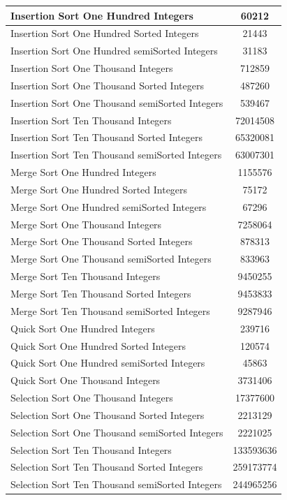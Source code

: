 \documentclass[]{article}
\begin{document}
	\begin{tabular}{|l|c|}
		\hline
		Insertion Sort One Hundred Integers & 60212\\
		\hline
		Insertion Sort One Hundred Sorted Integers & 21443\\
		\hline
		Insertion Sort One Hundred semiSorted Integers & 31183\\
		\hline
		Insertion Sort One Thousand Integers & 712859\\
		\hline
		Insertion Sort One Thousand Sorted Integers & 487260\\
		\hline
		Insertion Sort One Thousand semiSorted Integers & 539467\\
		\hline
		Insertion Sort Ten Thousand Integers & 72014508\\
		\hline
		Insertion Sort Ten Thousand Sorted Integers & 65320081\\
		\hline
		Insertion Sort Ten Thousand semiSorted Integers & 63007301\\
		\hline
		Merge Sort One Hundred Integers & 1155576\\
		\hline
		Merge Sort One Hundred Sorted Integers & 75172\\
		\hline
		Merge Sort One Hundred semiSorted Integers & 67296\\
		\hline
		Merge Sort One Thousand Integers & 7258064\\
		\hline
		Merge Sort One Thousand Sorted Integers & 878313\\
		\hline
		Merge Sort One Thousand semiSorted Integers & 833963\\
		\hline
		Merge Sort Ten Thousand Integers & 9450255\\
		\hline
		Merge Sort Ten Thousand Sorted Integers & 9453833\\
		\hline
		Merge Sort Ten Thousand semiSorted Integers & 9287946\\
		\hline
		Quick Sort One Hundred Integers & 239716\\
		\hline
		Quick Sort One Hundred Sorted Integers & 120574\\
		\hline
		Quick Sort One Hundred semiSorted Integers & 45863\\
		\hline
		Quick Sort One Thousand Integers & 3731406\\
		\hline	\hline
		Selection Sort One Thousand Integers & 17377600\\
		\hline
		Selection Sort One Thousand Sorted Integers & 2213129\\
		\hline
		Selection Sort One Thousand semiSorted Integers & 2221025\\
		\hline
		Selection Sort Ten Thousand Integers & 133593636\\
		\hline
		Selection Sort Ten Thousand Sorted Integers & 259173774\\
		\hline
		Selection Sort Ten Thousand semiSorted Integers & 244965256\\
		\hline
	\end{tabular}
\newpage
\end{document}
